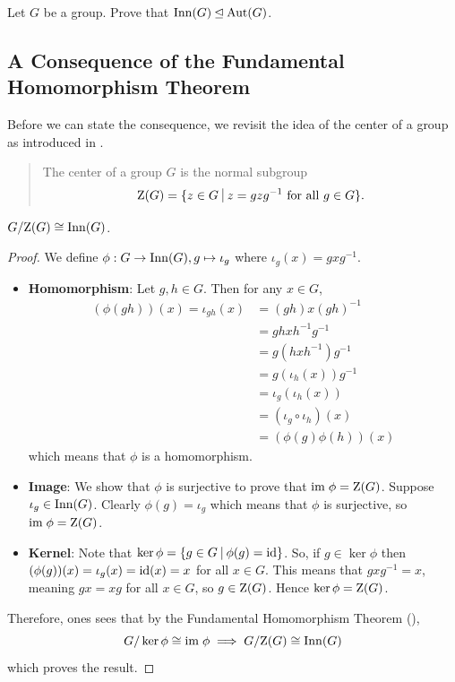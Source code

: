 \begin{exercise}
    Let $G$ be a group. Prove that $\mathrm{Inn}(G) \unlhd \mathrm{Aut}(G)$.
\end{exercise}

\subsection{A Consequence of the Fundamental Homomorphism Theorem}
Before we can state the consequence, we revisit the idea of the center of a group as introduced in .
\begin{quote}
    The center of a group $G$ is the normal subgroup
    \[
        \Z{G} = \{z \in G \vert z = gzg^{-1} \text{ for all } g \in G\}.
    \]
\end{quote}

\begin{proposition}
    $G/\mathrm{Z}(G) \cong \mathrm{Inn}(G)$.
\end{proposition}
\begin{proof}
    We define $\phi: G \to \mathrm{Inn}(G), g \mapsto \iota_g$ where $\iota_g(x) = gxg^{-1}$.
    \begin{itemize}
        \item \textbf{Homomorphism}: Let $g, h \in G$. Then for any $x \in G$,
        \begin{align*}
            (\phi(gh))(x) = \iota_{gh}(x) &= (gh)x(gh)^{-1}\\
            &= ghxh^{-1}g^{-1}\\
            &= g(hxh^{-1})g^{-1}\\
            &= g(\iota_h(x))g^{-1}\\
            &=\iota_g(\iota_h(x))\\
            &=(\iota_g\circ\iota_h)(x)\\
            &=(\phi(g)\phi(h))(x)
        \end{align*}
        which means that $\phi$ is a homomorphism.

        \item \textbf{Image}: We show that $\phi$ is surjective to prove that $\mathrm{im}\; \phi = \mathrm{Z}(G)$. Suppose $\iota_g \in \mathrm{Inn}(G)$. Clearly $\phi(g) = \iota_g$  which means that $\phi$ is surjective, so $\mathrm{im}\;\phi = \mathrm{Z}(G)$.

        \item \textbf{Kernel}: Note that $\ker\phi = \{g \in G \vert \phi(g) = \id\}$. So, if $g \in \ker\phi$ then $(\phi(g))(x) = \iota_g(x) = \mathrm{id}(x) = x$ for all $x \in G$. This means that $gxg^{-1} = x$, meaning $gx = xg$ for all $x \in G$, so $g \in \mathrm{Z}(G)$. Hence $\ker\phi = \mathrm{Z}(G)$.
    \end{itemize}
    Therefore, ones sees that by the Fundamental Homomorphism Theorem (),
    \[
        G/\ker\phi \cong \mathrm{im}\;\phi \implies G/\mathrm{Z}(G) \cong \mathrm{Inn}(G)
    \]
    which proves the result.
\end{proof}

